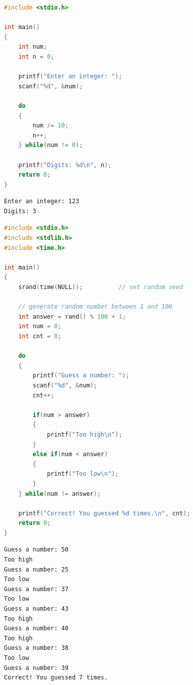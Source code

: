 
\begin{lstlisting}[language=C]
#include <stdio.h>

int main()
{
    int num;
    int n = 0;

    printf("Enter an integer: ");
    scanf("%d", &num);

    do
    {
        num /= 10;
        n++;
    } while(num != 0);

    printf("Digits: %d\n", n);
    return 0;
}
\end{lstlisting}

\begin{tcolorbox}
    \begin{verbatim}
Enter an integer: 123
Digits: 3
\end{verbatim}
\end{tcolorbox}

\vspace{0.5cm}


\begin{lstlisting}[language=C]
#include <stdio.h>
#include <stdlib.h>
#include <time.h>

int main()
{
    srand(time(NULL));          // set random seed

    // generate random number between 1 and 100
    int answer = rand() % 100 + 1;
    int num = 0;
    int cnt = 0;

    do
    {
        printf("Guess a number: ");
        scanf("%d", &num);
        cnt++;
        
        if(num > answer)
        {
            printf("Too high\n");
        }
        else if(num < answer)
        {
            printf("Too low\n");
        }
    } while(num != answer);
    
    printf("Correct! You guessed %d times.\n", cnt);
    return 0;
}
\end{lstlisting}

\begin{tcolorbox}
    \begin{verbatim}
Guess a number: 50
Too high
Guess a number: 25
Too low
Guess a number: 37
Too low
Guess a number: 43
Too high
Guess a number: 40
Too high
Guess a number: 38
Too low
Guess a number: 39
Correct! You guessed 7 times.
\end{verbatim}
\end{tcolorbox}

\newpage


